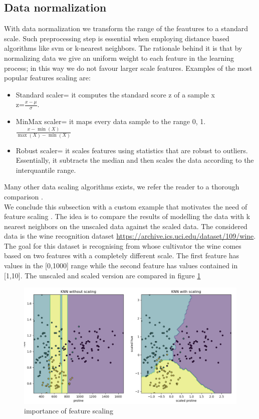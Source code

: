 \subsection{Data normalization}\label{appendix:normalization}
With data normalization we transform the range of the feautures to a standard scale.
Such preprocessing step is essential when employing distance based algorithms like svm or k-nearest neighbors. The rationale behind it is that by normalizing data we give an uniform weight to each feature in the learning process; in this way we do not favour larger scale features.
Examples of the most popular features scaling are:
\begin{itemize}
    \item Standard scaler= it computes the standard score z of a sample x
    \\
    z=$\frac{x-\mu}{\sigma}$.
    \item MinMax scaler= it maps every data sample to the range 0, 1.
    \\
    $\frac{x-\min(X)}{\max(X)-\min(X)}$
    \item Robust scaler= it scales features using statistics that are robust to outliers.
    Essentially, it subtracts the median and then scales the data according to the interquantile range.
\end{itemize}
Many other data scaling algorithms exists, we refer the reader to a thorough comparison \cite{scikitscalers}.
\\
We conclude this subsection with a custom example that motivates the need of feature scaling \cite{scikitscale_example}. The idea is to compare the results of modelling the data with k nearest neighbors on the unscaled data against the scaled data. The considered data is the wine recognition dataset \href{https://archive.ics.uci.edu/dataset/109/wine}{https://archive.ics.uci.edu/dataset/109/wine}. The goal for this dataset is recognising from whose cultivator the wine comes based on two features with a completely different scale. The first feature has values in the [0,1000] range while the second feature has values contained in [1,10].
The unscaled and scaled version are compared in figure \ref{fig:feature_scaler_example}
\begin{figure}[!h]
    \includegraphics[width=\textwidth]{images/feature_scaler_example.png}
    \caption{importance of feature scaling}
    \label{fig:feature_scaler_example}
\end{figure}
